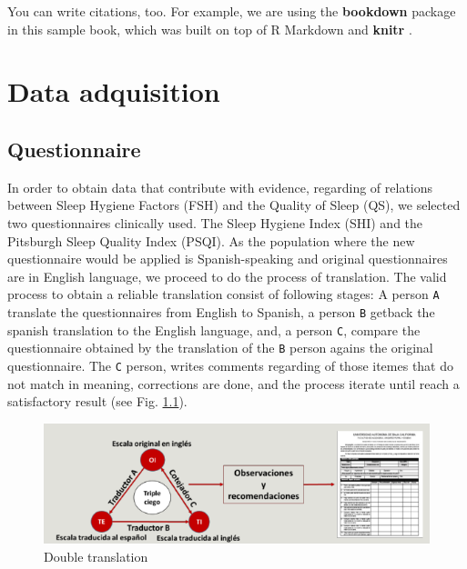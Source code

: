 \documentclass[]{book}
\begin{document}
You can write citations, too. For example, we are using the
\textbf{bookdown} package \citep{R-bookdown} in this sample book, which
was built on top of R Markdown and \textbf{knitr} \citep{xie2015}.

\chapter{Data adquisition}\label{data-adquisition}

\section{Questionnaire}\label{questionnaire}

In order to obtain data that contribute with evidence, regarding of
relations between Sleep Hygiene Factors (FSH) and the Quality of Sleep
(QS), we selected two questionnaires clinically used. The Sleep Hygiene
Index (SHI) and the Pitsburgh Sleep Quality Index (PSQI). As the
population where the new questionnaire would be applied is
Spanish-speaking and original questionnaires are in English language, we
proceed to do the process of translation. The valid process to obtain a
reliable translation consist of following stages: A person \texttt{A}
translate the questionnaires from English to Spanish, a person
\texttt{B} getback the spanish translation to the English language, and,
a person \texttt{C}, compare the questionnaire obtained by the
translation of the \texttt{B} person agains the original questionnaire.
The \texttt{C} person, writes comments regarding of those itemes that do
not match in meaning, corrections are done, and the process iterate
until reach a satisfactory result (see Fig. \ref{fig:double-tr}).

\begin{figure}

{\centering \includegraphics[width=0.8\linewidth]{images/double-translation} 

}

\caption{Double translation}\label{fig:double-tr}
\end{figure}
\end{document}
